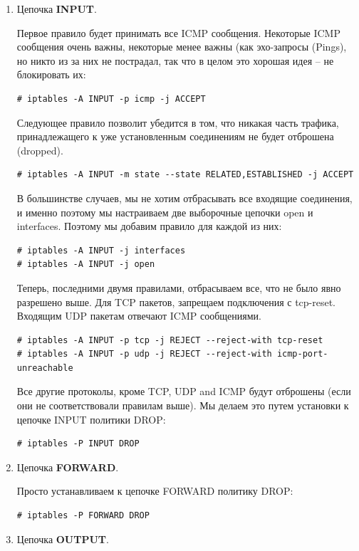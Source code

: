 \documentclass[a4paper]{article}
\begin{document}
		\begin{enumerate}
		
			\item Цепочка \textbf{INPUT}.
			
				Первое правило будет принимать все ICMP сообщения. Некоторые ICMP сообщения очень важны, некоторые менее важны (как эхо-запросы (Pings), но никто из за них не пострадал, так что в целом это хорошая идея -- не блокировать их:
				\begin{verbatim}
# iptables -A INPUT -p icmp -j ACCEPT
				\end{verbatim}	
				Следующее правило позволит убедится в том, что никакая часть трафика, принадлежащего к уже установленным соединениям не будет отброшена (dropped).	
				\begin{verbatim}
# iptables -A INPUT -m state --state RELATED,ESTABLISHED -j ACCEPT
				\end{verbatim}
				В большинстве случаев, мы не хотим отбрасывать все входящие соединения, и именно поэтому мы настраиваем две выборочные цепочки open и interfaces. Поэтому мы добавим правило для каждой из них:
				\begin{verbatim}
# iptables -A INPUT -j interfaces
# iptables -A INPUT -j open
				\end{verbatim}		
				Теперь, последними двумя правилами, отбрасываем все, что не было явно разрешено выше. Для TCP пакетов, запрещаем подключения с tcp-reset. Входящим UDP пакетам отвечают ICMP сообщениями.	
				\begin{verbatim}
# iptables -A INPUT -p tcp -j REJECT --reject-with tcp-reset 
# iptables -A INPUT -p udp -j REJECT --reject-with icmp-port-unreachable 
				\end{verbatim}		
				Все другие протоколы, кроме TCP, UDP and ICMP будут отброшены (если они не соответствовали правилам выше). Мы делаем это путем установки к цепочке INPUT политики DROP:
				\begin{verbatim}
# iptables -P INPUT DROP		
				\end{verbatim}			
		
			\item Цепочка \textbf{FORWARD}.
			
				Просто устанавливаем к цепочке FORWARD политику DROP:		
				\begin{verbatim}
# iptables -P FORWARD DROP	
				\end{verbatim}	
				
			\item Цепочка \textbf{OUTPUT}.
			

\end{enumerate}
\end{document}
